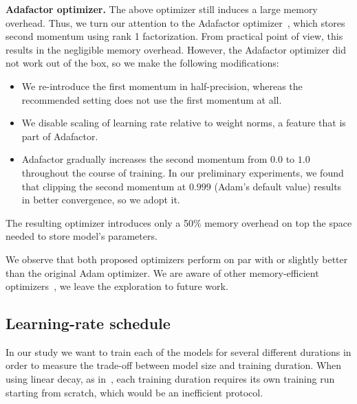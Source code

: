 \textbf{Adafactor optimizer.} The above optimizer still induces a large memory overhead. Thus, we turn our attention to the Adafactor optimizer~\cite{adafactor}, which stores second momentum using rank 1 factorization. From practical point of view, this results in the negligible memory overhead. However, the Adafactor optimizer did not work out of the box, so we make the following modifications:
\begin{itemize}
    \item We re-introduce the first momentum in half-precision, whereas the recommended setting does not use the first momentum at all.
    \item We disable scaling of learning rate relative to weight norms, a feature that is part of Adafactor.
    \item Adafactor gradually increases the second momentum from $0.0$ to $1.0$ throughout the course of training. In our preliminary experiments, we found that clipping the second momentum at $0.999$ (Adam's default value) results in better convergence, so we adopt it.
\end{itemize}
The resulting optimizer introduces only a 50\% memory overhead on top the space needed to store model's parameters. 

We observe that both proposed optimizers perform on par with  or slightly better than the original Adam optimizer.
We are aware of other memory-efficient optimizers~\cite{zero_optimizer,adam_1bit}, we leave the exploration to future work.

\subsection{Learning-rate schedule}

In our study we want to train each of the models for several different durations in order to measure the trade-off between model size and training duration.
When using linear decay, as in~\cite{dosovitskiy2020}, each training duration requires its own training run starting from scratch, which would be an inefficient protocol.

